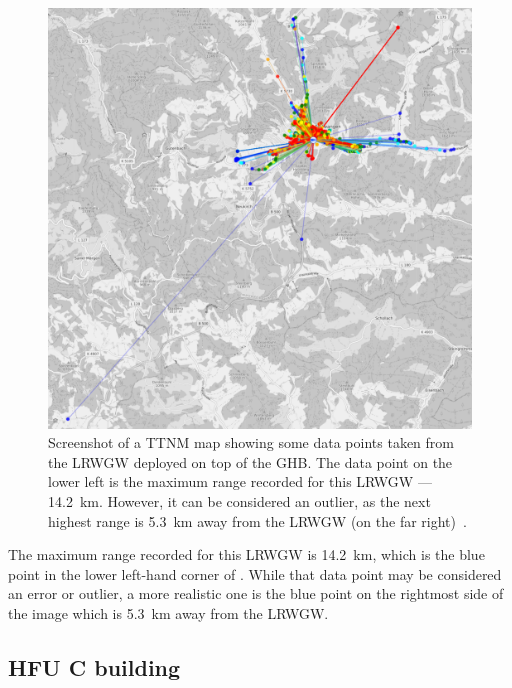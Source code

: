 \begin{figure}[htbp]
    \centering
    \includegraphics[width=1\textwidth]{pictures/ttn-mapper/gateway-ranges/ghb_mikrotik_gw_range.png}
    \caption[Screenshot of a \acl{TTNM} map showing some data points taken from the \acl{LRWGW} deployed on top of the \acl{GHB}]{
        Screenshot of a \ac{TTNM} map showing some data points taken from the \acl{LRWGW} deployed on top of the \ac{GHB}.
        The data point on the lower left is the maximum range recorded for this \acl{LRWGW} --- \SI{14.2}{\kilo\meter}.
        However, it can be considered an outlier, as the next highest range is \SI{5.3}{\kilo\meter} away from the \acl{LRWGW} (on the far right)~\cite{ttn_mapper_ttn_2023}.
    }\label{pic:ghb_mikrotik_gw_range}
\end{figure}

The maximum range recorded for this \acl{LRWGW} is \SI{14.2}{\kilo\meter}, which is the blue point in the lower left-hand corner of .
While that data point may be considered an error or outlier, a more realistic one is the blue point on the rightmost side of the image which is \SI{5.3}{\kilo\meter} away from the \acl{LRWGW}.

\subsection{\acl{HFU} C building}

